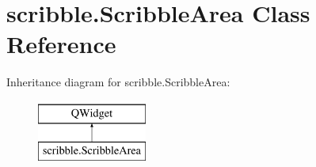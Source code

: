 \hypertarget{classscribble_1_1ScribbleArea}{}\section{scribble.\+Scribble\+Area Class Reference}
\label{classscribble_1_1ScribbleArea}
Inheritance diagram for scribble.\+Scribble\+Area\+:\begin{figure}[H]
\begin{center}
\leavevmode
\includegraphics[height=2.000000cm]{classscribble_1_1ScribbleArea}
\end{center}
\end{figure}
